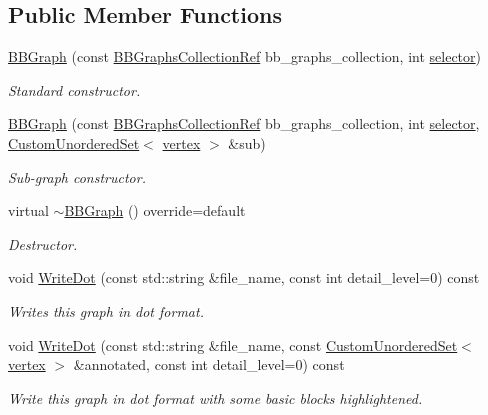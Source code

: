 \subsection*{Public Member Functions}
\begin{DoxyCompactItemize}
\item 
\hyperlink{structBBGraph_ad61c411b14472f81d07dfc90b312a2b1}{B\+B\+Graph} (const \hyperlink{basic__block_8hpp_ab2c15dfa325570d7a3e0e364c2f5fdfa}{B\+B\+Graphs\+Collection\+Ref} bb\+\_\+graphs\+\_\+collection, int \hyperlink{structgraph_ab06c362711200ca8c15e3d85fef7957b}{selector})
\begin{DoxyCompactList}\small\item\em Standard constructor. \end{DoxyCompactList}\item 
\hyperlink{structBBGraph_a566184a7a8e1e5609cfc824f1dbce4a4}{B\+B\+Graph} (const \hyperlink{basic__block_8hpp_ab2c15dfa325570d7a3e0e364c2f5fdfa}{B\+B\+Graphs\+Collection\+Ref} bb\+\_\+graphs\+\_\+collection, int \hyperlink{structgraph_ab06c362711200ca8c15e3d85fef7957b}{selector}, \hyperlink{classCustomUnorderedSet}{Custom\+Unordered\+Set}$<$ \hyperlink{graph_8hpp_abefdcf0544e601805af44eca032cca14}{vertex} $>$ \&sub)
\begin{DoxyCompactList}\small\item\em Sub-\/graph constructor. \end{DoxyCompactList}\item 
virtual \hyperlink{structBBGraph_a9b68a739671cb354317cf68727232266}{$\sim$\+B\+B\+Graph} () override=default
\begin{DoxyCompactList}\small\item\em Destructor. \end{DoxyCompactList}\item 
void \hyperlink{structBBGraph_a4f364a493a1d4c43bdee96970d545bf0}{Write\+Dot} (const std\+::string \&file\+\_\+name, const int detail\+\_\+level=0) const
\begin{DoxyCompactList}\small\item\em Writes this graph in dot format. \end{DoxyCompactList}\item 
void \hyperlink{structBBGraph_ac3de1a4ef5c0ffb8fda93854dc724473}{Write\+Dot} (const std\+::string \&file\+\_\+name, const \hyperlink{classCustomUnorderedSet}{Custom\+Unordered\+Set}$<$ \hyperlink{graph_8hpp_abefdcf0544e601805af44eca032cca14}{vertex} $>$ \&annotated, const int detail\+\_\+level=0) const
\begin{DoxyCompactList}\small\item\em Write this graph in dot format with some basic blocks highlightened. \end{DoxyCompactList}\item 

\end{DoxyCompactItemize}
